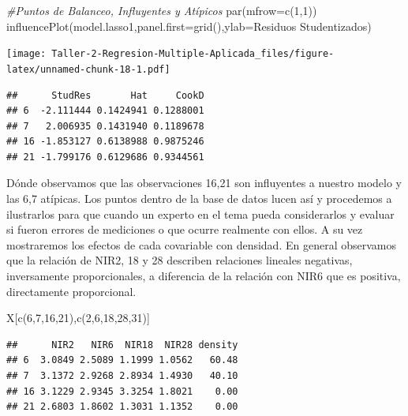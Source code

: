 \documentclass[
]{article}
\newenvironment{Shaded}{\begin{snugshade}}{\end{snugshade}}
\newcommand{\AttributeTok}[1]{\textcolor[rgb]{0.77,0.63,0.00}{#1}}
\newcommand{\CommentTok}[1]{\textcolor[rgb]{0.56,0.35,0.01}{\textit{#1}}}
\newcommand{\DecValTok}[1]{\textcolor[rgb]{0.00,0.00,0.81}{#1}}
\newcommand{\FunctionTok}[1]{\textcolor[rgb]{0.00,0.00,0.00}{#1}}
\newcommand{\NormalTok}[1]{#1}
\newcommand{\StringTok}[1]{\textcolor[rgb]{0.31,0.60,0.02}{#1}}
\begin{document}
\begin{Shaded}
\begin{Highlighting}[]
\CommentTok{\#Puntos de Balanceo, Influyentes y Atípicos}
\FunctionTok{par}\NormalTok{(}\AttributeTok{mfrow=}\FunctionTok{c}\NormalTok{(}\DecValTok{1}\NormalTok{,}\DecValTok{1}\NormalTok{))}
\FunctionTok{influencePlot}\NormalTok{(model.lasso1,}\AttributeTok{panel.first=}\FunctionTok{grid}\NormalTok{(),}\AttributeTok{ylab=}\StringTok{\textquotesingle{}Residuos Studentizados\textquotesingle{}}\NormalTok{)}
\end{Highlighting}
\end{Shaded}

\texttt{[image: Taller-2-Regresion-Multiple-Aplicada\_files/figure-latex/unnamed-chunk-18-1.pdf]}

\begin{verbatim}
##      StudRes       Hat     CookD
## 6  -2.111444 0.1424941 0.1288001
## 7   2.006935 0.1431940 0.1189678
## 16 -1.853127 0.6138988 0.9875246
## 21 -1.799176 0.6129686 0.9344561
\end{verbatim}

Dónde observamos que las observaciones 16,21 son influyentes a nuestro
modelo y las 6,7 atípicas. Los puntos dentro de la base de datos lucen
así y procedemos a ilustrarlos para que cuando un experto en el tema
pueda considerarlos y evaluar si fueron errores de mediciones o que
ocurre realmente con ellos. A su vez mostraremos los efectos de cada
covariable con densidad. En general observamos que la relación de NIR2,
18 y 28 describen relaciones lineales negativas, inversamente
proporcionales, a diferencia de la relación con NIR6 que es positiva,
directamente proporcional.

\begin{Shaded}
\begin{Highlighting}[]
\NormalTok{X[}\FunctionTok{c}\NormalTok{(}\DecValTok{6}\NormalTok{,}\DecValTok{7}\NormalTok{,}\DecValTok{16}\NormalTok{,}\DecValTok{21}\NormalTok{),}\FunctionTok{c}\NormalTok{(}\DecValTok{2}\NormalTok{,}\DecValTok{6}\NormalTok{,}\DecValTok{18}\NormalTok{,}\DecValTok{28}\NormalTok{,}\DecValTok{31}\NormalTok{)]}
\end{Highlighting}
\end{Shaded}

\begin{verbatim}
##      NIR2   NIR6  NIR18  NIR28 density
## 6  3.0849 2.5089 1.1999 1.0562   60.48
## 7  3.1372 2.9268 2.8934 1.4930   40.10
## 16 3.1229 2.9345 3.3254 1.8021    0.00
## 21 2.6803 1.8602 1.3031 1.1352    0.00
\end{verbatim}
\end{document}
